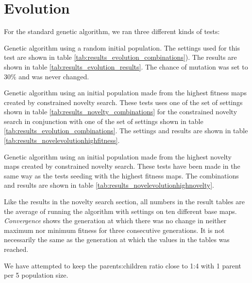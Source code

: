 \section{Evolution}
\label{results_evolution}



For the standard genetic algorithm, we ran three different kinds of tests:

\begin{my_itemize}

	\item Genetic algorithm using a random initial population. The settings used for this test are shown in table \ref{tab:results_evolution_combinations}). The results are shown in table \ref{tab:results_evolution_results}. The chance of mutation was set to 30\% and was never changed.

	\item Genetic algorithm using an initial population made from the highest fitness maps created by constrained novelty search. These tests uses one of the set of settings shown in table \ref{tab:results_novelty_combinations} for the constrained novelty search in conjunction with one of the set of settings shown in table \ref{tab:results_evolution_combinations}. The settings and results are shown in table \ref{tab:results_novelevolutionhighfitness}.

	\item Genetic algorithm using an initial population made from the highest novelty maps created by constrained novelty search. These tests have been made in the same way as the tests seeding with the highest fitness maps. The combinations and results are shown in table \ref{tab:results_novelevolutionhighnovelty}.

\end{my_itemize}

Like the results in the novelty search section, all numbers in the result tables are the average of running the algorithm with settings on ten different base maps. \textit{Convergence} shows the generation at which there was no change in neither maximum nor minimum fitness for three consecutive generations. It is not necessarily the same as the generation at which the values in the tables was reached.

We have attempted to keep the parents:children ratio close to 1:4 with 1 parent per 5 population size.

